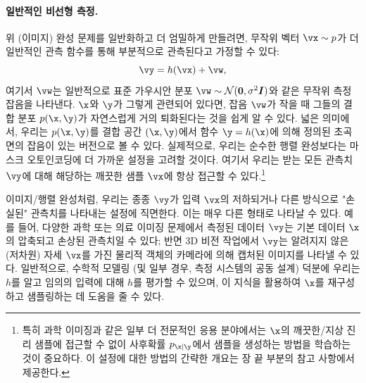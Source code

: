 \documentclass[../../book-main_ko.tex]{subfiles}
\begin{document}
\paragraph{일반적인 비선형 측정.}
위 (이미지) 완성 문제를 일반화하고 더 엄밀하게 만들려면, 무작위 벡터 $\vx \sim p$가 더 일반적인 관측 함수를 통해 부분적으로 관측된다고 가정할 수 있다:
\begin{equation}\label{eq:measurement-matching-observation}
\vy = h(\vx) + \vw,
\end{equation}
여기서 $\vw$는 일반적으로 표준 가우시안 분포 $\vw \sim \mathcal{N}(\mathbf{0}, \sigma^2 \boldsymbol{I})$와 같은 무작위 측정 잡음을 나타낸다. $\x$와 $\y$가 그렇게 관련되어 있다면, 잡음 $\vw$가 작을 때 그들의 결합 분포 $p(\x, \y)$가 자연스럽게 거의 퇴화된다는 것을 쉽게 알 수 있다. 넓은 의미에서, 우리는 $p(\x, \y)$를 결합 공간 $(\x, \y)$에서 함수 $\y = h(\x)$에 의해 정의된 초곡면의 잡음이 있는 버전으로 볼 수 있다. 실제적으로, 우리는 순수한 행렬 완성보다는 마스크 오토인코딩에 더 가까운 설정을 고려할 것이다. 여기서 우리는 받는 모든 관측치 $\vy$에 대해 해당하는 깨끗한 샘플 $\vx$에 항상 접근할 수 있다.\footnote{특히 과학 이미징과 같은 일부 더 전문적인 응용 분야에서는 $\x$의 깨끗한/지상 진리 샘플에 접근할 수 없이 사후확률 $p_{\x \mid \y}$에서 샘플을 생성하는 방법을 학습하는 것이 중요하다. 이 설정에 대한 방법의 간략한 개요는 장 끝 부분의 참고 사항에서 제공한다.}

이미지/행렬 완성처럼, 우리는 종종 $\vy$가 입력 $\vx$의 저하되거나 다른 방식으로 "손실된" 관측치를 나타내는 설정에 직면한다. 이는 매우 다른 형태로 나타날 수 있다. 예를 들어, 다양한 과학 또는 의료 이미징 문제에서 측정된 데이터 $\vy$는 기본 데이터 $\x$의 압축되고 손상된 관측치일 수 있다; 반면 3D 비전 작업에서 $\vy$는 알려지지 않은 (저차원) 자세 $\vx$를 가진 물리적 객체의 카메라에 의해 캡처된 이미지를 나타낼 수 있다.
일반적으로, 수학적 모델링 (및 일부 경우, 측정 시스템의 공동 설계) 덕분에 우리는 $h$를 알고 임의의 입력에 대해 $h$를 평가할 수 있으며, 이 지식을 활용하여 $\x$를 재구성하고 샘플링하는 데 도움을 줄 수 있다.
\end{document}
